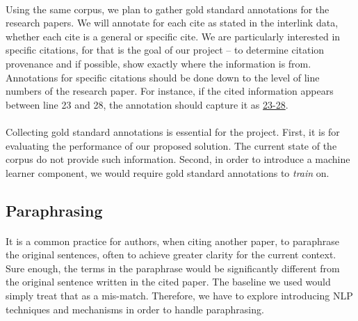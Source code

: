 \documentclass[12 pt]{article}
\begin{document}
\paragraph{}
Using the same corpus, we plan to gather gold standard annotations for the research papers. We will annotate for each cite as stated in the interlink data, whether each cite is a general or specific cite. We are particularly interested in specific citations, for that is the goal of our project -- to determine citation provenance and if possible, show exactly where the information is from. Annotations for specific citations should be done down to the level of line numbers of the research paper. For instance, if the cited information appears between line 23 and 28, the annotation should capture it as \url{23-28}.

\paragraph{}
Collecting gold standard annotations is essential for the project. First, it is for evaluating the performance of our proposed solution. The current state of the corpus do not provide such information. Second, in order to introduce a machine learner component, we would require gold standard annotations to \textit{train} on.

\subsection{Paraphrasing}
\paragraph{}
It is a common practice for authors, when citing another paper, to paraphrase the original sentences, often to achieve greater clarity for the current context. Sure enough, the terms in the paraphrase would be significantly different from the original sentence written in the cited paper. The baseline we used would simply treat that as a mis-match. Therefore, we have to explore introducing NLP techniques and mechanisms in order to handle paraphrasing.

\singlespacing

\end{document}

